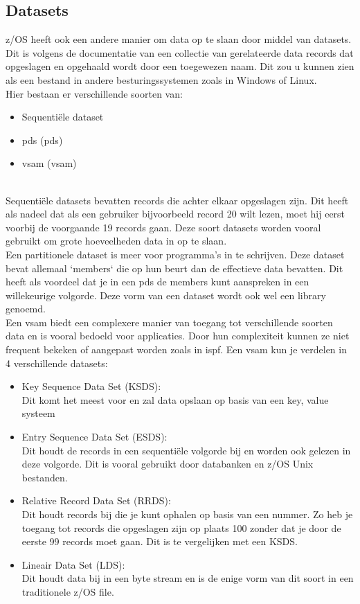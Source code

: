 \subsection{Datasets}
z/OS heeft ook een andere manier om data op te slaan door middel van datasets. Dit is volgens de documentatie van \textcite{IBM} een collectie van gerelateerde data records dat opgeslagen en opgehaald wordt door een toegewezen naam. Dit zou u kunnen zien als een bestand in andere besturingssystemen zoals in Windows of Linux. \\

Hier bestaan er verschillende soorten van:

\begin{itemize}
    \item Sequentiële dataset
    \item \acrlong{pds} (\acrshort{pds})
    \item \acrlong{vsam} (\acrshort{vsam})
\end{itemize} \\

Sequentiële datasets bevatten records die achter elkaar opgeslagen zijn. Dit heeft als nadeel dat als een gebruiker bijvoorbeeld record 20 wilt lezen, moet hij eerst voorbij de voorgaande 19 records gaan. Deze soort datasets worden vooral gebruikt om grote hoeveelheden data in op te slaan. \autocite{IBM} \\

Een partitionele dataset is meer voor programma's in te schrijven. Deze dataset bevat allemaal `members` die op hun beurt dan de effectieve data bevatten. Dit heeft als voordeel dat je in een \acrshort{pds} de members kunt aanspreken in een willekeurige volgorde. Deze vorm van een dataset wordt ook wel een library genoemd. \autocite{IBM} \\

Een \acrshort{vsam} biedt een complexere manier van toegang tot verschillende soorten data en is vooral bedoeld voor applicaties. Door hun complexiteit kunnen ze niet frequent bekeken of aangepast worden zoals in \acrshort{ispf}. Een \acrshort{vsam} kun je verdelen in 4 verschillende datasets:
\begin{itemize}
    \item Key Sequence Data Set (KSDS): \\Dit komt het meest voor en zal data opslaan op basis van een key, value systeem
    \item Entry Sequence Data Set (ESDS): \\Dit houdt de records in een sequentiële volgorde bij en worden ook gelezen in deze volgorde. Dit is vooral gebruikt door databanken en z/OS Unix bestanden.
    \item Relative Record Data Set (RRDS): \\Dit houdt records bij die je kunt ophalen op basis van een nummer. Zo heb je toegang tot records die opgeslagen zijn op plaats 100 zonder dat je door de eerste 99 records moet gaan. Dit is te vergelijken met een KSDS.
    \item Lineair Data Set (LDS): \\Dit houdt data bij in een byte stream en is de enige vorm van dit soort in een traditionele z/OS file.
\end{itemize}
\autocite{IBM}
